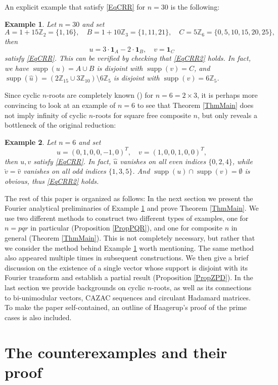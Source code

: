 \documentclass[A4,11pt]{article}
\DeclareMathOperator{\supp}{supp}
\newtheorem{Ex}{Example}
\begin{document}
An explicit example that satisfy \eqref{EqCRR} for $n=30$ is the following:
\begin{Ex} \label{ExCR}
Let $n=30$ and set
$$A=1+15\mathbb Z_2=\{1,16\}, \quad B=1+10\mathbb Z_3=\{1,11,21\}, \quad C=5\mathbb Z_6=\{0,5,10,15,20,25\},$$
then
$$u=3\cdot \mathbf 1_A-2\cdot\mathbf 1_B, \quad v=\mathbf 1_C$$
satisfy \eqref{EqCRR}. This can be verified by checking that \eqref{EqCRR2} holds. In fact, we have $\supp(u)=A\cup B$ is disjoint with $\supp(v)=C$, and $\supp(\hat u)=(2\mathbb Z_{15}\cup 3\mathbb Z_{10})\setminus 6\mathbb Z_5$ is disjoint with $\supp(v)=6\mathbb Z_5$.
\end{Ex}

Since cyclic $n$-roots are completely known (\cite{bjorck1991}) for $n=6=2\times 3$, it is perhaps more convincing to look at an example of $n=6$ to see that Theorem \ref{ThmMain} does not imply infinity of cyclic $n$-roots for square free composite $n$, but only reveals a bottleneck of the original reduction:
\begin{Ex} \label{ExCR2}
Let $n=6$ and set
$$u=(0,1,0,0,-1,0)^T, \quad v=(1,0,0,1,0,0)^T,$$
then $u,v$ satisfy \eqref{EqCRR}. In fact, $\hat u$ vanishes on all even indices $\{0,2,4\}$, while $\check v=\hat v$ vanishes on all odd indices $\{1,3,5\}$.
And $\supp(u)\cap\supp(v)=\emptyset$ is obvious, thus \eqref{EqCRR2} holds.
\end{Ex}

The rest of this paper is organized as follows: In the next section we present the Fourier analytical preliminaries of Example \ref{ExCR} and prove Theorem \ref{ThmMain}. We use two different methods to construct two different types of examples, one for $n=pqr$ in particular (Proposition \ref{PropPQR}), and one for composite $n$ in general (Theorem \ref{ThmMain}). This is not completely necessary, but rather that we consider the method behind Example \ref{ExCR} worth mentioning. The same method also appeared multiple times in subsequent constructions. We then give a brief discussion on the existence of a single vector whose support is disjoint with its Fourier transform and establish a partial result (Proposition \ref{PropZPD}). In the last section we provide backgrounds on cyclic $n$-roots, as well as its connections to bi-unimodular vectors, CAZAC sequences and circulant Hadamard matrices. To make the paper self-contained, an outline of Haagerup's proof of the prime cases is also included. 

\section{The counterexamples and their proof}
\end{document}
